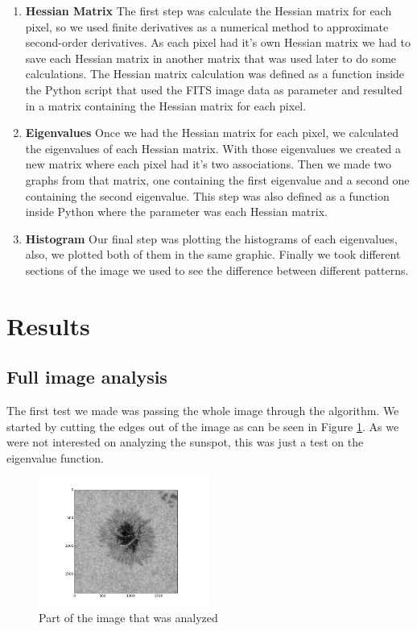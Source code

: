 \documentclass{article}
\begin{document}
\begin{enumerate}[label=\textbf{\arabic*}.]
    \item \textbf{Hessian Matrix} The first step was calculate the Hessian matrix for each pixel, so we used finite derivatives as a numerical method to approximate second-order derivatives. As each pixel had it's own Hessian matrix we had to save each Hessian matrix in another matrix that was used later to do some calculations. The Hessian matrix calculation was defined as a function inside the Python script that used the FITS image data as parameter and resulted in a matrix containing the Hessian matrix for each pixel.
    
    \item \textbf{Eigenvalues} Once we had the Hessian matrix for each pixel, we calculated the eigenvalues of each Hessian matrix. With those eigenvalues we created a new matrix where each pixel had it's two associations. Then we made two graphs from that matrix, one containing the first eigenvalue and a second one containing the second eigenvalue. This step was also defined as a function inside Python where the parameter was each Hessian matrix. 
    
    \item \textbf{Histogram} Our final step was plotting the histograms of each eigenvalues, also, we plotted both of them in the same graphic. Finally we took different sections of the image we used to see the difference between different patterns.
    
\end{enumerate}


\section{Results}

\subsection{Full image analysis}

The first test we made was passing the whole image through the algorithm. We started by cutting the edges out of the image as can be seen in Figure \ref{fig:fullAnalyzed}. As we were not interested on analyzing the sunspot, this was just a test on the eigenvalue function.

\begin{figure}[H]
    \centering
    \includegraphics[width=0.5\textwidth]{full/analyzed}
    \caption{Part of the image that was analyzed}
    \label{fig:fullAnalyzed}
\end{figure}
\end{document}
